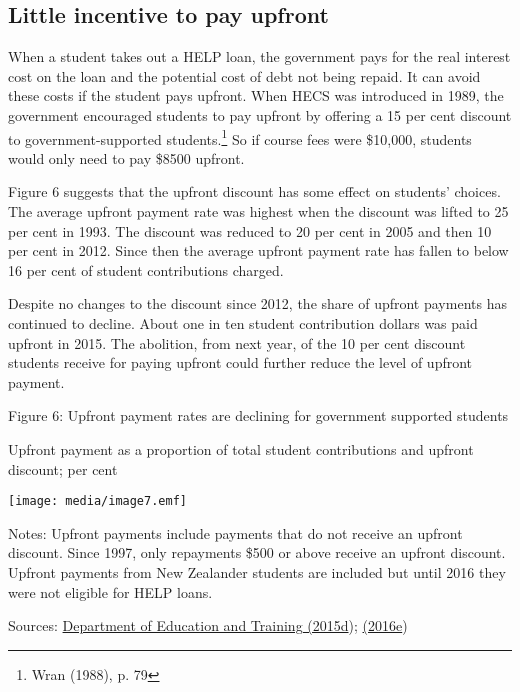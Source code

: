 \documentclass[]{book}
\begin{document}
\subsection{\texorpdfstring{\protect\hypertarget{_Ref333152519}{}{\protect\hypertarget{_Ref335384889}{}{\protect\hypertarget{_Ref333848257}{}{}}}Little incentive to pay upfront }{Little incentive to pay upfront }}\label{little-incentive-to-pay-upfront}

When a student takes out a HELP loan, the government pays for the real interest cost on the loan and the potential cost of debt not being repaid. It can avoid these costs if the student pays upfront. When HECS was introduced in 1989, the government encouraged students to pay upfront by offering a 15 per cent discount to government-supported students.\footnote{Wran (1988), p. 79} So if course fees were \$10,000, students would only need to pay \$8500 upfront.

Figure 6 suggests that the upfront discount has some effect on students' choices. The average upfront payment rate was highest when the discount was lifted to 25 per cent in 1993. The discount was reduced to 20 per cent in 2005 and then 10 per cent in 2012. Since then the average upfront payment rate has fallen to below 16 per cent of student contributions charged.

Despite no changes to the discount since 2012, the share of upfront payments has continued to decline. About one in ten student contribution dollars was paid upfront in 2015. The abolition, from next year, of the 10 per cent discount students receive for paying upfront could further reduce the level of upfront payment.

\protect\hypertarget{_Ref325371144}{}{}Figure 6: Upfront payment rates are declining for government supported students

Upfront payment as a proportion of total student contributions and upfront discount; per cent

\texttt{[image: media/image7.emf]}

Notes: Upfront payments include payments that do not receive an upfront discount. Since 1997, only repayments \$500 or above receive an upfront discount. Upfront payments from New Zealander students are included but until 2016 they were not eligible for HELP loans.

Sources: \protect\hyperlink{_ENREF_27}{Department of Education and Training (2015d}); \protect\hyperlink{_ENREF_33}{(2016e})
\end{document}
